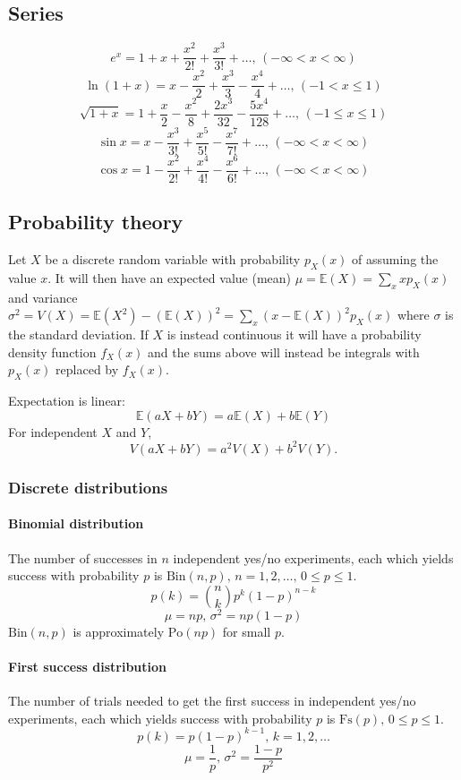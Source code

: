 \begin{multicols}{\Columns}
\subsection{Series}
$$e^x = 1+x+\frac{x^2}{2!}+\frac{x^3}{3!}+\dots,\,(-\infty<x<\infty)$$
$$\ln(1+x) = x-\frac{x^2}{2}+\frac{x^3}{3}-\frac{x^4}{4}+\dots,\,(-1<x\leq1)$$
$$\sqrt{1+x} = 1+\frac{x}{2}-\frac{x^2}{8}+\frac{2x^3}{32}-\frac{5x^4}{128}+\dots,\,(-1\leq x\leq1)$$
$$\sin x = x-\frac{x^3}{3!}+\frac{x^5}{5!}-\frac{x^7}{7!}+\dots,\,(-\infty<x<\infty)$$
$$\cos x = 1-\frac{x^2}{2!}+\frac{x^4}{4!}-\frac{x^6}{6!}+\dots,\,(-\infty<x<\infty)$$

\subsection{Probability theory}
Let $X$ be a discrete random variable with probability $p_X(x)$ of assuming the value $x$. It will then have an expected value (mean) $\mu=\mathbb{E}(X)=\sum_xxp_X(x)$ and variance $\sigma^2=V(X)=\mathbb{E}(X^2)-(\mathbb{E}(X))^2=\sum_x(x-\mathbb{E}(X))^2p_X(x)$ where $\sigma$ is the standard deviation. If $X$ is instead continuous it will have a probability density function $f_X(x)$ and the sums above will instead be integrals with $p_X(x)$ replaced by $f_X(x)$.

Expectation is linear:
\[\mathbb{E}(aX+bY) = a\mathbb{E}(X)+b\mathbb{E}(Y)\]
For independent $X$ and $Y$, \[V(aX+bY) = a^2V(X)+b^2V(Y).\]

\subsubsection{Discrete distributions}

\paragraph{Binomial distribution}
The number of successes in $n$ independent yes/no experiments, each which yields success with probability $p$ is $\textrm{Bin}(n,p),\,n=1,2,\dots,\, 0\leq p\leq1$.
\[p(k)=\binom{n}{k}p^k(1-p)^{n-k}\]
\[\mu = np,\,\sigma^2=np(1-p)\]
$\textrm{Bin}(n,p)$ is approximately $\textrm{Po}(np)$ for small $p$.

\paragraph{First success distribution}
The number of trials needed to get the first success in independent yes/no experiments, each which yields success with probability $p$ is $\textrm{Fs}(p),\,0\leq p\leq1$.
\[p(k)=p(1-p)^{k-1},\,k=1,2,\dots\]
\[\mu = \frac1p,\,\sigma^2=\frac{1-p}{p^2}\]


\end{multicols}
